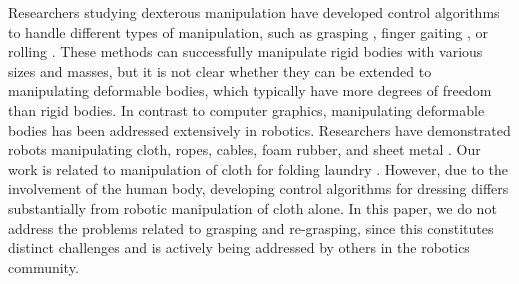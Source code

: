 


Researchers studying dexterous manipulation have developed control
algorithms to handle different types of manipulation, such as grasping
\cite{Pollard:2005:PBG,Kry:2006:ICS,Wang:2013:VHM,Zhao:2013:RRP}, finger
gaiting \cite{Ye:2012:SDH}, or rolling \cite{Bai:2014:DMU}. These methods
can successfully manipulate rigid bodies with various sizes and masses,
but it is not clear whether they can be extended to manipulating
deformable bodies, which typically have more degrees of freedom than rigid
bodies. In contrast to computer graphics, manipulating deformable bodies
has been addressed extensively in robotics. Researchers have demonstrated
robots manipulating cloth, ropes, cables, foam rubber, and sheet metal
\cite{Kosuge:1995:MFO,Wu:1995:AHC,Fahantidis:1997:RHF,Osawa:2007:UML,Cusumano:2011:BCD,Bersch:2011:BRC,Miller:2012:GAR}.
Our work is related to manipulation of cloth for folding laundry
\cite{Osawa:2007:UML,Cusumano:2011:BCD,Bersch:2011:BRC,Miller:2012:GAR}.
However, due to the involvement of the human body, developing control
algorithms for dressing differs substantially from robotic manipulation of
cloth alone. In this paper, we do not address the problems related to
grasping and re-grasping, since this constitutes distinct challenges and
is actively being addressed by others in the robotics community.



